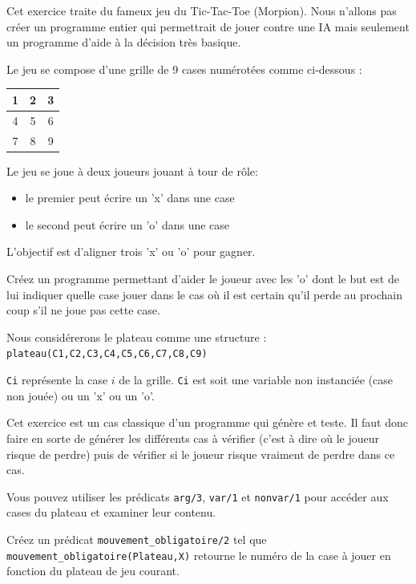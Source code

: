 \documentclass[a4paper]{article}
\newenvironment{CAnswer}{\color{red}\begin{Answer}}
                        {\end{Answer}}
\begin{document}
\begin{CAnswer}

\end{CAnswer}


\begin{Exercise}[title={Tic-Tac-Toe }]
Cet exercice traite du fameux jeu du Tic-Tac-Toe (Morpion). Nous n'allons pas
créer un programme entier qui permettrait de jouer contre une IA mais seulement
un programme d'aide à la décision très basique. 

Le jeu se compose d'une grille de 9 cases numérotées comme ci-dessous :
\begin{center}
\begin{tabular}{|c|c|c|}\hline
 1 & 2 & 3 \\\hline
 4 & 5 & 6 \\\hline
 7 & 8 & 9 \\\hline
\end{tabular}
\end{center}

Le jeu se joue à deux joueurs jouant à tour de rôle:
\begin{itemize}
 \item le premier peut écrire un 'x' dans une case
 \item le second peut écrire un 'o' dans une case
\end{itemize}

L'objectif est d'aligner trois 'x' ou 'o' pour gagner.

Créez un programme permettant d'aider le joueur avec les 'o' dont le but est
de lui indiquer quelle case jouer dans le cas où il est certain qu'il perde au
prochain coup s'il ne joue pas cette case.

Nous considérerons le plateau comme une structure : 
\verb#plateau(C1,C2,C3,C4,C5,C6,C7,C8,C9)#

\verb#Ci# représente la case $i$ de la grille. \verb#Ci# est soit une variable
non instanciée (case non jouée) ou un 'x' ou un 'o'.

Cet exercice est un cas classique d'un programme qui génère et teste. Il faut
donc faire en sorte de générer les différents cas à vérifier (c'est à dire où
le joueur risque de perdre) puis de vérifier si le joueur risque vraiment de
perdre dans ce cas.

Vous pouvez utiliser les prédicats \verb#arg/3#, \verb#var/1# et
\verb#nonvar/1# pour accéder aux cases du plateau et examiner leur contenu.

Créez un prédicat \verb#mouvement_obligatoire/2# tel que 
\verb#mouvement_obligatoire(Plateau,X)# retourne le numéro de la case à jouer
en fonction du plateau de jeu courant.


\end{Exercise}
\end{document}
